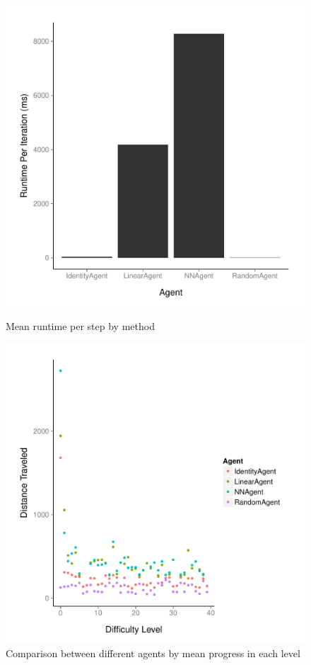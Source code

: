 \documentclass[12pt]{article}
\begin{document}
\begin{figure}
\begin{minipage}{0.5\textwidth}
\includegraphics[scale=0.5]{imgs/runtime_bar.pdf}
\caption{Mean runtime per step by method}
\label{runtime_bar}
\end{minipage}
\begin{minipage}{0.5\textwidth}
\includegraphics[scale=0.5]{imgs/dist_levels.pdf}
\caption{Comparison between different agents by mean progress in each level}
\label{scatter_levels}
\end{minipage}
\end{figure}
\end{document}
